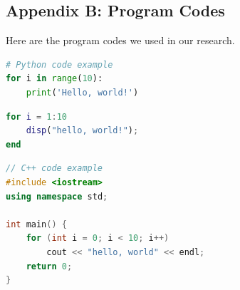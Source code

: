 \documentclass[12pt]{article}  %
\begin{document}
\begin{subappendices}
\section{Appendix B: Program Codes}
Here are the program codes we used in our research.


\begin{lstlisting}[language=Python, name={test.py}]
# Python code example
for i in range(10):
    print('Hello, world!')
\end{lstlisting}

\begin{lstlisting}[language=MATLAB, name={test.m}]
% MATLAB code example
for i = 1:10
    disp("hello, world!");
end
\end{lstlisting}



\begin{lstlisting}[language=C++, name={test.cpp}]
// C++ code example
#include <iostream>
using namespace std;

int main() {
    for (int i = 0; i < 10; i++)
        cout << "hello, world" << endl;
    return 0;
}
\end{lstlisting}

\end{subappendices}  %
\end{document}
